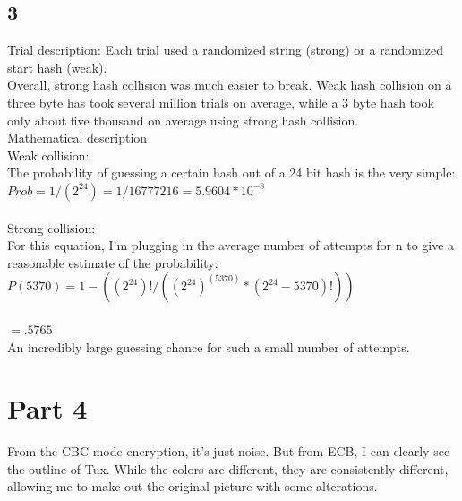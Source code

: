 \documentclass[10pt,letterpaper]{article}
\begin{document}
\subsection*{3}
Trial description: Each trial used a randomized string (strong) or a randomized
start hash (weak). \\

\noindent Overall, strong hash collision was much easier to break. Weak
hash collision on a three byte has took several million trials on average,
while a 3 byte hash took only about five thousand on average using strong hash
collision.\\

\noindent Mathematical description\\
\noindent Weak collision:\\
\noindent The probability of guessing a certain hash out of a 24 bit hash is the very
simple:\\

$Prob = 1/(2^{24}) = 1/16777216 = 5.9604 * 10^{-8}$\\\\

\noindent Strong collision:\\
\noindent For this equation, I'm plugging in the average number of attempts for n to give
a reasonable estimate of the probability:\\

$P(5370) = 1 - ((2^{24})!/((2^{24})^(5370)*(2^{24}-5370)!))$\\\\
$=.5765$\\

\noindent An incredibly large guessing chance for such a small number of attempts. 


\section*{Part 4}
From the CBC mode encryption, it's just noise. But from ECB, I can clearly see the outline
of Tux. While the colors are different, they are consistently different, allowing me
to make out the original picture with some alterations.\\ 
\end{document}

